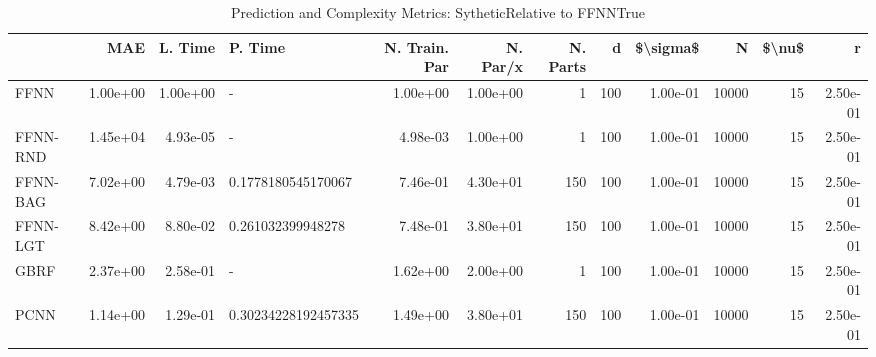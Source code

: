 \begin{table}
\centering
\caption{Prediction and Complexity Metrics: SytheticRelative to FFNNTrue}
\label{tab__Sythetic__Fix_Neurons_QTrue}
\begin{tabular}{lrrlrrrrrrrr}
\toprule
{} &      MAE &  L. Time &              P. Time &  N. Train. Par &  N. Par/x &  N. Parts &    d &  \$\textbackslash sigma\$ &      N &  \$\textbackslash nu\$ &        r \\
\midrule
FFNN     & 1.00e+00 & 1.00e+00 &                    - &       1.00e+00 &  1.00e+00 &         1 &  100 &  1.00e-01 &  10000 &     15 & 2.50e-01 \\
FFNN-RND & 1.45e+04 & 4.93e-05 &                    - &       4.98e-03 &  1.00e+00 &         1 &  100 &  1.00e-01 &  10000 &     15 & 2.50e-01 \\
FFNN-BAG & 7.02e+00 & 4.79e-03 &   0.1778180545170067 &       7.46e-01 &  4.30e+01 &       150 &  100 &  1.00e-01 &  10000 &     15 & 2.50e-01 \\
FFNN-LGT & 8.42e+00 & 8.80e-02 &    0.261032399948278 &       7.48e-01 &  3.80e+01 &       150 &  100 &  1.00e-01 &  10000 &     15 & 2.50e-01 \\
GBRF     & 2.37e+00 & 2.58e-01 &                    - &       1.62e+00 &  2.00e+00 &         1 &  100 &  1.00e-01 &  10000 &     15 & 2.50e-01 \\
PCNN     & 1.14e+00 & 1.29e-01 &  0.30234228192457335 &       1.49e+00 &  3.80e+01 &       150 &  100 &  1.00e-01 &  10000 &     15 & 2.50e-01 \\
\bottomrule
\end{tabular}
\end{table}
